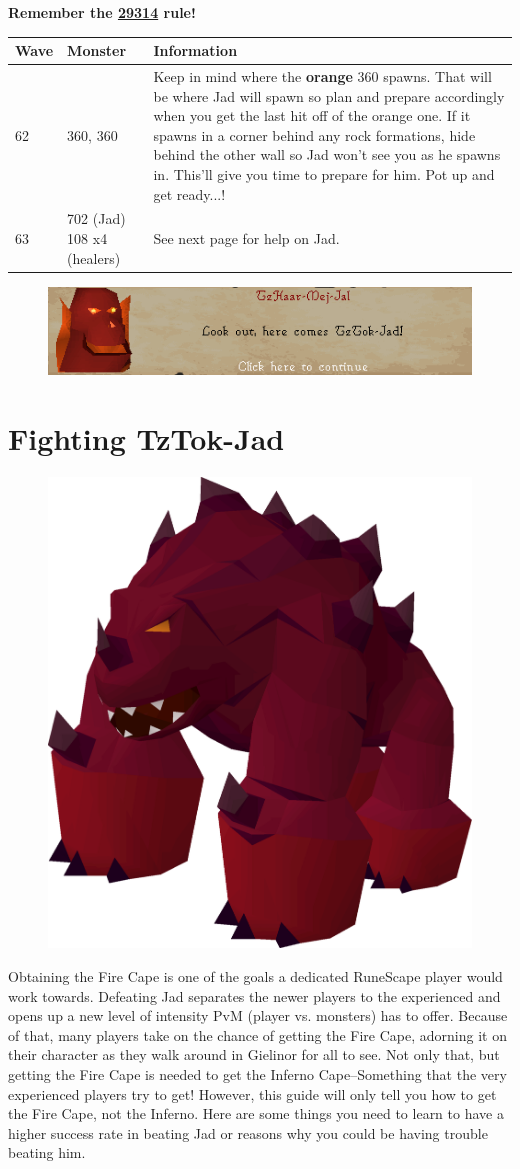 \documentclass{article}
\newlength\myheight
\newlength\mydepth
\newcommand*\inlinegraphics[1]{%
  \settototalheight\myheight{Xygp}%
  \settodepth\mydepth{Xygp}%
  \raisebox{-\mydepth}{\texttt{[image: \#1]}}%
}
\begin{document}
\huge  \inlinegraphics{jad.png}  \textbf{Remember the \underline{29314} rule!}\inlinegraphics{jad.png}    
\begin{table}[!htbt]
    \begin{tabular}{  l  p{3.4cm}  p{3.4cm} }
        \toprule
\textbf{Wave}      
& \textbf{Monster}   
& \textbf{Information} \\\midrule
62 & 360, 360 & Keep in mind where the \textbf{orange} 360 spawns. That will be where Jad will spawn so plan and prepare accordingly when you get the last hit off of the orange one. If it spawns in a corner behind any rock formations, hide behind the other wall so Jad won't see you as he spawns in. This'll give you time to prepare for him. Pot up and get ready...! \\\hline

63 & 702 (Jad) 108 x4 (healers) & See next page for help on Jad.

    \end{tabular}
\end{table}

\begin{figure}[!h]
    \centering
    \includegraphics[scale = .8]{lookout.png}
\end{figure}
\newpage


\section{Fighting TzTok-Jad} 
\begin{figure}
\includegraphics[width=.2\textwidth]{jad.png}
\end{figure}

\par \normalsize Obtaining the Fire Cape is one of the goals a dedicated RuneScape player would work towards. Defeating Jad separates the newer players to the experienced and opens up a new level of intensity PvM (player vs. monsters) has to offer. Because of that, many players take on the chance of getting the Fire Cape, adorning it on their character as they walk around in Gielinor for all to see. Not only that, but getting the Fire Cape is needed to get the Inferno Cape--Something that the very experienced players try to get! However, this guide will only tell you how to get the Fire Cape, not the Inferno. Here are some things you need to learn to have a higher success rate in beating Jad or reasons why you could be having trouble beating him. 
\end{document}
